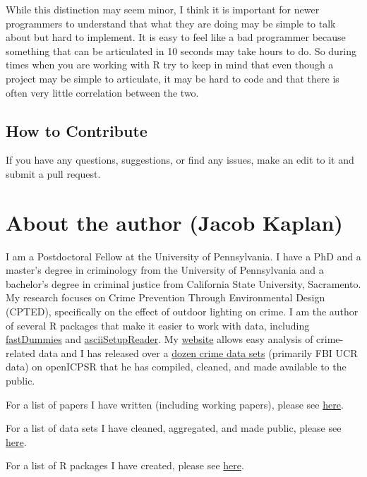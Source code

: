 \documentclass[
  12pt,
]{book}
\begin{document}
While this distinction may seem minor, I think it is important for newer programmers to understand that what they are doing may be simple to talk about but hard to implement. It is easy to feel like a bad programmer because something that can be articulated in 10 seconds may take hours to do. So during times when you are working with R try to keep in mind that even though a project may be simple to articulate, it may be hard to code and that there is often very little correlation between the two.

\hypertarget{how-to-contribute}{%
\section*{How to Contribute}\label{how-to-contribute}}


If you have any questions, suggestions, or find any issues, make an edit to it and submit a pull request.

\hypertarget{about-the-author-jacob-kaplan}{%
\chapter*{About the author (Jacob Kaplan)}\label{about-the-author-jacob-kaplan}}


I am a Postdoctoral Fellow at the University of Pennsylvania. I have a PhD and a master's degree in criminology from the University of Pennsylvania and a bachelor's degree in criminal justice from California State University, Sacramento. My research focuses on Crime Prevention Through Environmental Design (CPTED), specifically on the effect of outdoor lighting on crime. I am the author of several R packages that make it easier to work with data, including \href{https://jacobkap.github.io/fastDummies/}{fastDummies} and \href{https://jacobkap.github.io/asciiSetupReader/}{asciiSetupReader}. My \href{http://jacobdkaplan.com/}{website} allows easy analysis of crime-related data and I has released over a \href{http://jacobdkaplan.com/data.html}{dozen crime data sets} (primarily FBI UCR data) on openICPSR that he has compiled, cleaned, and made available to the public.

For a list of papers I have written (including working papers), please see \href{http://jacobdkaplan.com/research.html}{here}.

For a list of data sets I have cleaned, aggregated, and made public, please see \href{http://jacobdkaplan.com/data.html}{here}.

For a list of R packages I have created, please see \href{http://jacobdkaplan.com/packages/html}{here}.
\end{document}
